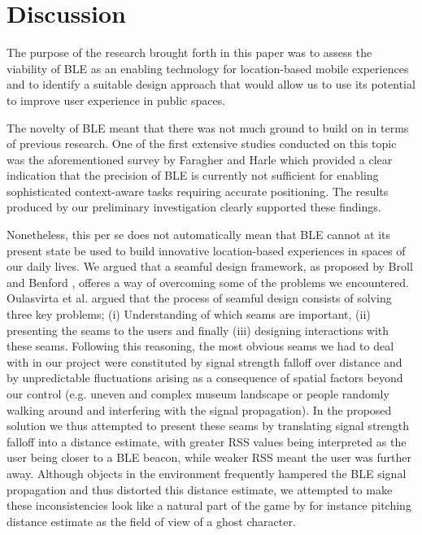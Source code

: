 \documentclass[prodmode,acmtomm]{acmsmall}
\begin{document}
\section{Discussion}
The purpose of the research brought forth in this paper was to assess the viability of BLE as an enabling technology for location-based mobile experiences and to identify a suitable design approach that would allow us to use its potential to improve user experience in public spaces. 


The novelty of BLE meant that there was not much ground to build on in terms of previous research. One of the first extensive studies conducted on this topic was the aforementioned survey by Faragher and Harle \cite{Faragher2014b} which provided a clear indication that the precision of BLE is currently not sufficient for enabling sophisticated context-aware tasks requiring accurate positioning. The results produced by our preliminary investigation clearly supported these findings. 

Nonetheless, this per se does not automatically mean that BLE cannot at its present state be used to build innovative location-based experiences in spaces of our daily lives. We argued that a seamful design framework, as proposed by Broll and Benford \cite{benford2005}, offeres a way of overcoming some of the problems we encountered. Oulasvirta et al. \cite{Oulasvirta2004} argued that the process of seamful design consists of solving three key problems; (i) Understanding of which seams are important, (ii) presenting the seams to the users and finally (iii) designing interactions with these seams. Following this reasoning, the most obvious seams we had to deal with in our project were constituted by signal strength falloff over distance and by unpredictable fluctuations arising as a consequence of spatial factors beyond our control (e.g. uneven and complex museum landscape or people randomly walking around and interfering with the signal propagation). In the proposed solution we thus attempted to present these seams by translating signal strength falloff into a distance estimate, with greater RSS values being interpreted as the user being closer to a BLE beacon, while weaker RSS meant the user was further away. Although objects in the environment frequently hampered the BLE signal propagation and thus distorted this distance estimate, we attempted to make these inconsistencies look like a natural part of the game by for instance pitching distance estimate as the field of view of a ghost character. 
\end{document}
